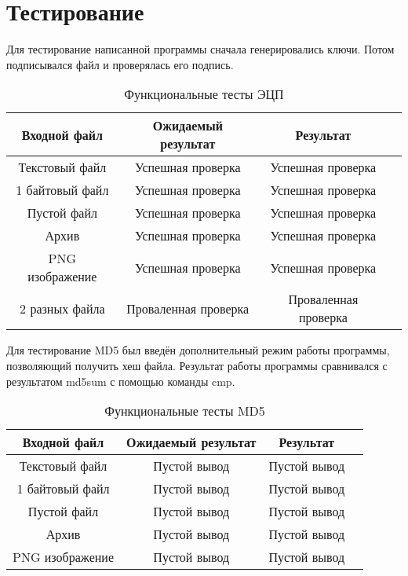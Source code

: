 \section{Тестирование}

Для тестирование написанной программы сначала генерировались ключи. Потом подписывался файл и проверялась его подпись.

\begin{table}[h]
	\begin{center}
		\begin{threeparttable}
			\captionsetup{justification=raggedright,singlelinecheck=off}
			\caption{\label{tbl:functional_RSA} Функциональные тесты ЭЦП}
			\begin{tabular}{|c|c|c|c|}
				\hline
				Входной файл & Ожидаемый результат & Результат \\ 
				\hline
				Текстовый файл & Успешная проверка &Успешная проверка\\
				\hline
				1 байтовый файл & Успешная проверка &Успешная проверка\\
				\hline
				Пустой файл & Успешная проверка &Успешная проверка\\
				\hline
				Архив & Успешная проверка &Успешная проверка\\
				\hline
				PNG изображение & Успешная проверка &Успешная проверка\\
				\hline
				2 разных файла & Проваленная проверка &Проваленная проверка\\
				\hline
			\end{tabular}
		\end{threeparttable}
	\end{center}
\end{table}
\FloatBarrier

Для тестирование MD5 был введён дополнительный режим работы программы, позволяющий получить хеш файла. Результат работы программы сравнивался с результатом md5sum с помощью команды cmp.

\begin{table}[h]
	\begin{center}
		\begin{threeparttable}
			\captionsetup{justification=raggedright,singlelinecheck=off}
			\caption{\label{tbl:functional_MD5} Функциональные тесты MD5}
			\begin{tabular}{|c|c|c|c|}
				\hline
				Входной файл & Ожидаемый результат & Результат \\ 
				\hline
				Текстовый файл & Пустой вывод &Пустой вывод\\
				\hline
				1 байтовый файл & Пустой вывод &Пустой вывод\\
				\hline
				Пустой файл & Пустой вывод &Пустой вывод\\
				\hline
				Архив & Пустой вывод &Пустой вывод\\
				\hline
				PNG изображение & Пустой вывод &Пустой вывод\\
				\hline
			\end{tabular}
		\end{threeparttable}
	\end{center}
\end{table}
\FloatBarrier
